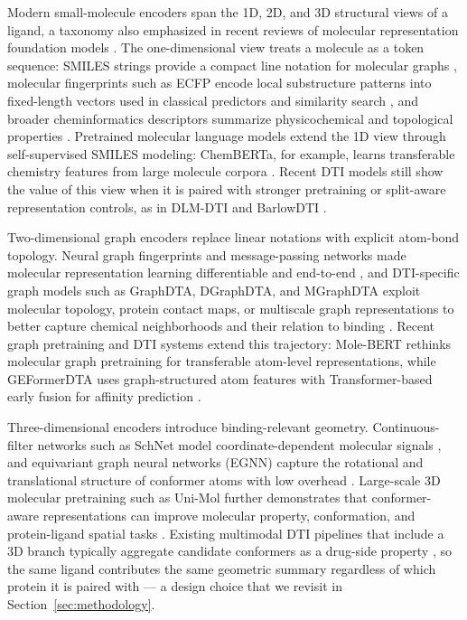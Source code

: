 Modern small-molecule encoders span the 1D, 2D, and 3D structural views of a ligand, a taxonomy also
emphasized in recent reviews of molecular representation foundation models \citep{song2026molecular}. The
one-dimensional view treats a molecule as a token sequence: SMILES strings provide a compact line notation
for molecular graphs \citep{weininger1988smiles}, molecular fingerprints such as ECFP encode local
substructure patterns into fixed-length vectors used in classical predictors and similarity search
\citep{rogers2010ecfp}, and broader cheminformatics descriptors summarize physicochemical and topological
properties \citep{todeschini2009descriptors}. Pretrained molecular language models extend the 1D view through
self-supervised SMILES modeling: ChemBERTa, for example, learns transferable chemistry features from large
molecule corpora \citep{chithrananda2020chemberta}. Recent DTI models still show the value of this view when
it is paired with stronger pretraining or split-aware representation controls, as in DLM-DTI and BarlowDTI
\citep{lee2024dlmdti,schuh2025barlowdti}.

Two-dimensional graph encoders replace linear notations with explicit atom-bond topology. Neural graph
fingerprints and message-passing networks made molecular representation learning differentiable and
end-to-end \citep{duvenaud2015graphfps,gilmer2017mpnn}, and DTI-specific graph models such as GraphDTA,
DGraphDTA, and MGraphDTA exploit molecular topology, protein contact maps, or multiscale graph
representations to better capture chemical neighborhoods and their relation to binding
\citep{nguyen2021graphdta,jiang2020dgraphdta,yang2022mgraphdta}. Recent graph pretraining and DTI systems
extend this trajectory: Mole-BERT rethinks molecular graph pretraining for transferable atom-level
representations, while GEFormerDTA uses graph-structured atom features with Transformer-based early fusion
for affinity prediction \citep{xia2023molebert,liu2024geformerdta}.

Three-dimensional encoders introduce binding-relevant geometry. Continuous-filter networks such as SchNet
model coordinate-dependent molecular signals \citep{schutt2017schnet}, and equivariant graph neural networks
(EGNN) capture the rotational and translational structure of conformer atoms with low overhead
\citep{satorras2021egnn}. Large-scale 3D molecular pretraining such as Uni-Mol further demonstrates that
conformer-aware representations can improve molecular property, conformation, and protein-ligand spatial
tasks \citep{zhou2023unimol}. Existing multimodal DTI pipelines that include a 3D branch typically aggregate
candidate conformers as a drug-side property \citep{satorras2021egnn,ji2026ldmdti}, so the same ligand
contributes the same geometric summary regardless of which protein it is paired with --- a design choice
that we revisit in Section~\ref{sec:methodology}.


